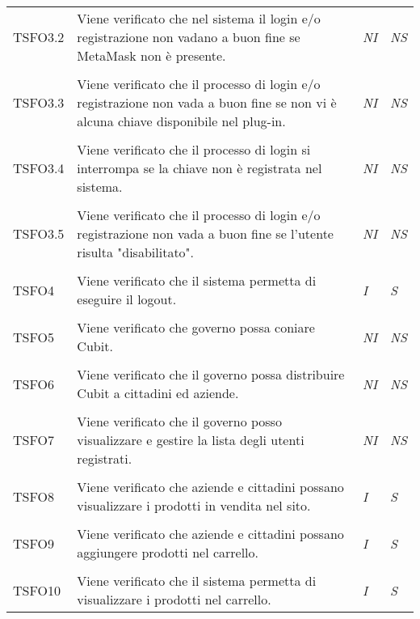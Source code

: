 \begin{longtable}{ >{\centering}p{} >{}p{}
			>{\centering}p{} >{\centering}p{}}
		\tabularnewline
		\hypertarget{TSFO3.2}{TSFO3.2} & Viene verificato che nel sistema il login e/o 
		registrazione non vadano a buon fine se MetaMask non è presente. & 
		\textit{NI} & \textit{NS}\\  

		\tabularnewline
		\hypertarget{TSFO3.3}{TSFO3.3} & Viene verificato che il processo di login e/o 
		registrazione non vada a buon fine se non vi è alcuna chiave disponibile nel 
		plug-in. & \textit{NI} & \textit{NS}\\ 

		\tabularnewline
		\hypertarget{TSFO3.4}{TSFO3.4} & Viene verificato che il processo di login si 
		interrompa se la chiave non è registrata nel sistema. & 
		\textit{NI} & \textit{NS}\\  

		\tabularnewline
		\hypertarget{TSFO3.5}{TSFO3.5} & Viene verificato che il processo di login e/o 
		registrazione non vada a buon fine se l'utente risulta "disabilitato". & 
		\textit{NI} & \textit{NS}\\ 

		\tabularnewline
		\hypertarget{TSFO4}{TSFO4} & Viene verificato che il sistema permetta di 
		eseguire il logout. & \textit{I} & \textit{S}\\ 

		\tabularnewline
		\hypertarget{TSFO5}{TSFO5} & Viene verificato che governo possa coniare Cubit. & 
		\textit{NI} & \textit{NS}\\ 

		\tabularnewline
		\hypertarget{TSFO6}{TSFO6} & Viene verificato che il governo possa distribuire 
		Cubit a cittadini ed aziende. & \textit{NI} & \textit{NS}\\ 

		\tabularnewline
		\hypertarget{TSFO7}{TSFO7} & Viene verificato che il governo posso visualizzare 
		e gestire la lista degli utenti registrati. & \textit{NI} & \textit{NS}\\ 

		\tabularnewline
		\hypertarget{TSFO8}{TSFO8} & Viene verificato che aziende e cittadini possano 
		visualizzare i prodotti in vendita nel sito. & \textit{I} & 
		\textit{S}\\ 

		\tabularnewline
		\hypertarget{TSFO9}{TSFO9} & Viene verificato che aziende e cittadini possano 
		aggiungere prodotti nel carrello. & \textit{I} & \textit{S}\\ 

		\tabularnewline
		\hypertarget{TSFO10}{TSFO10} & Viene verificato che il sistema permetta di 
		visualizzare i prodotti nel carrello. & \textit{I} & \textit{S}\\ 


\end{longtable}
